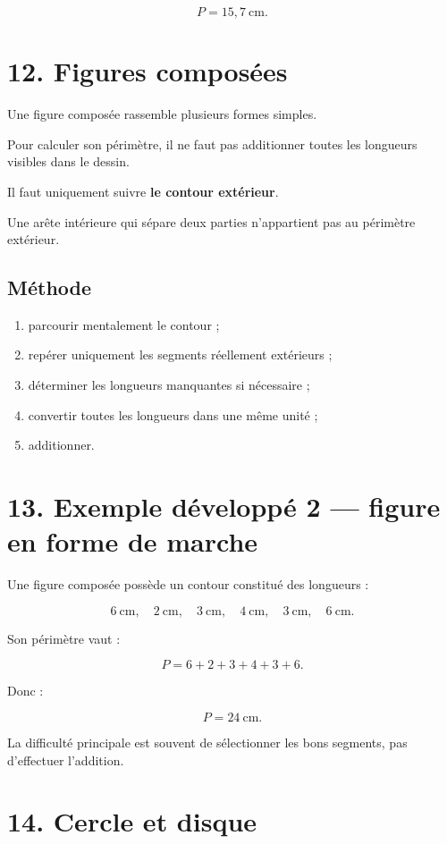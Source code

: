 \[
\boxed{P=15{,}7\ \text{cm}}.
\]

\section{12. Figures composées}

Une figure composée rassemble plusieurs formes simples.

Pour calculer son périmètre, il ne faut pas additionner toutes les longueurs visibles dans le dessin.

Il faut uniquement suivre \textbf{le contour extérieur}.

Une arête intérieure qui sépare deux parties n’appartient pas au périmètre extérieur.

\subsection{Méthode}

\begin{enumerate}
\item parcourir mentalement le contour ;
\item repérer uniquement les segments réellement extérieurs ;
\item déterminer les longueurs manquantes si nécessaire ;
\item convertir toutes les longueurs dans une même unité ;
\item additionner.
\end{enumerate}

\section{13. Exemple développé 2 — figure en forme de marche}

Une figure composée possède un contour constitué des longueurs :

\[
6\ \text{cm},\quad
2\ \text{cm},\quad
3\ \text{cm},\quad
4\ \text{cm},\quad
3\ \text{cm},\quad
6\ \text{cm}.
\]

Son périmètre vaut :

\[
P=6+2+3+4+3+6.
\]

Donc :

\[
\boxed{P=24\ \text{cm}}.
\]

La difficulté principale est souvent de sélectionner les bons segments, pas d’effectuer l’addition.

\section{14. Cercle et disque}

